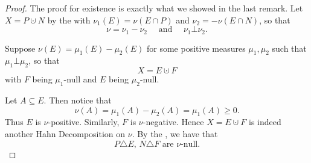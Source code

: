 \documentclass[notoc,notitlepage]{tufte-book}
\begin{document}
\begin{proof}
  The proof for existence is exactly what we showed in the last remark.
  Let $X = P \cupdot N$ by the 
  with $\nu_1(E) = \nu(E \cap P)$ and $\nu_2 = - \nu(E \cap N)$,
  so that
  \begin{equation*}
    \nu = \nu_1 - \nu_2 \quad\text{ and }\quad \nu_1 \bot \nu_2.
  \end{equation*}

  \noindent
  Suppose $\nu(E) = \mu_1(E) - \mu_2(E)$ for some positive measures
  $\mu_1, \mu_2$ such that $\mu_1 \bot \mu_2$, so that
  \begin{equation*}
    X = E \cupdot F
  \end{equation*}
  with $F$ being $\mu_1$-null and $E$ being $\mu_2$-null.

  Let $A \subseteq E$. Then notice that
  \begin{equation*}
    \nu(A) = \mu_1(A) - \mu_2(A) = \mu_1(A) \geq 0.
  \end{equation*}
  Thus $E$ is $\nu$-positive. Similarly, $F$ is $\nu$-negative.
  Hence $X = E \cupdot F$ is indeed another Hahn Decomposition on $\nu$.
  By the , we have that
  \begin{equation*}
    P \triangle E,\, N \triangle F \text{ are } \nu\text{-null}.
  \end{equation*}


\end{proof}
\end{document}
